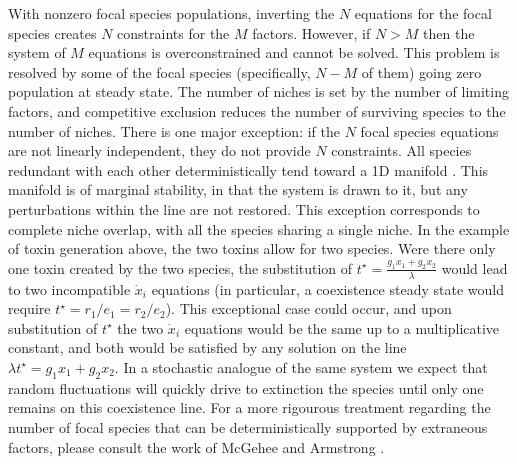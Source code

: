 \documentclass[a4paper,10pt]{article}
\numberwithin{equation}{section} %
\begin{document}
With nonzero focal species populations, inverting the $N$ equations for the focal species creates $N$ constraints for the $M$ factors. %
However, if $N>M$ then the system of $M$ equations is overconstrained and cannot be solved. 
This problem is resolved by some of the focal species (specifically, $N-M$ of them) going zero population at steady state. 
The number of niches is set by the number of limiting factors, and competitive exclusion reduces the number of surviving species to the number of niches. %
There is one major exception: if the $N$ focal species equations are not linearly independent, they do not provide $N$ constraints. %
All species redundant with each other deterministically tend toward a 1D manifold \cite{McGehee1977a,Case1979}. 
This manifold is of marginal stability, in that the system is drawn to it, but any perturbations within the line are not restored. 
This exception corresponds to complete niche overlap, with all the species sharing a single niche. 
In the example of toxin generation above, the two toxins allow for two species. Were there only one toxin created by the two species, the substitution of $t^\star = \frac{g_1 x_1 + g_2 x_2}{\lambda}$ would lead to two incompatible $\dot{x}_i$ equations (in particular, a coexistence steady state would require $t^\star=r_1/e_1=r_2/e_2$). %
This exceptional case could occur, and upon substitution of $t^\star$ the two $\dot{x}_i$ equations would be the same up to a multiplicative constant, and both would be satisfied by any solution on the line $\lambda t^\star = g_1 x_1 + g_2 x_2$. 
In a stochastic analogue of the same system we expect that random fluctuations will quickly drive to extinction the species until only one remains on this coexistence line. 
For a more rigourous treatment regarding the number of focal species that can be deterministically supported by extraneous factors, please consult the work of McGehee and Armstrong \cite{Armstrong1976,McGehee1977a}. 
\end{document}
